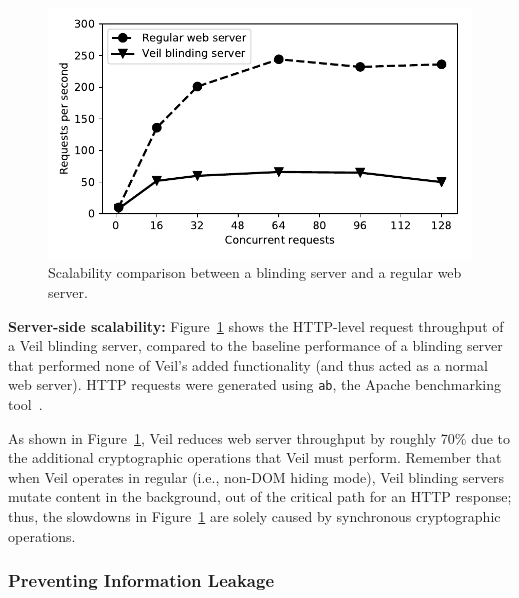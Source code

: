 \begin{figure}
	\centering
	\includegraphics[width=\textwidth]{veil-figs/scalability_mit.pdf}
	\caption{Scalability comparison between a blinding server
		and a regular web server.}
	\label{fig:scalability}
\end{figure}

\noindent
\textbf{Server-side scalability:}
Figure~\ref{fig:scalability} shows the HTTP-level
request throughput of a Veil blinding server,
compared to the baseline performance of a blinding
server that performed none of Veil's added functionality
(and thus acted as a normal web server).
HTTP requests were generated using \texttt{ab}, the Apache
benchmarking tool~\cite{ab}.

As shown in Figure~\ref{fig:scalability}, Veil
reduces web server throughput by roughly 70\%
due to the additional cryptographic operations
that Veil must perform. Remember that when
Veil operates in regular (i.e., non-DOM hiding
mode), Veil blinding servers mutate content in
the background, out of the critical path for an
HTTP response; thus, the slowdowns in Figure~\ref{fig:scalability}
are solely caused by synchronous cryptographic
operations. \\

\subsubsection{Preventing Information Leakage}
\label{sec:privLeaks}


